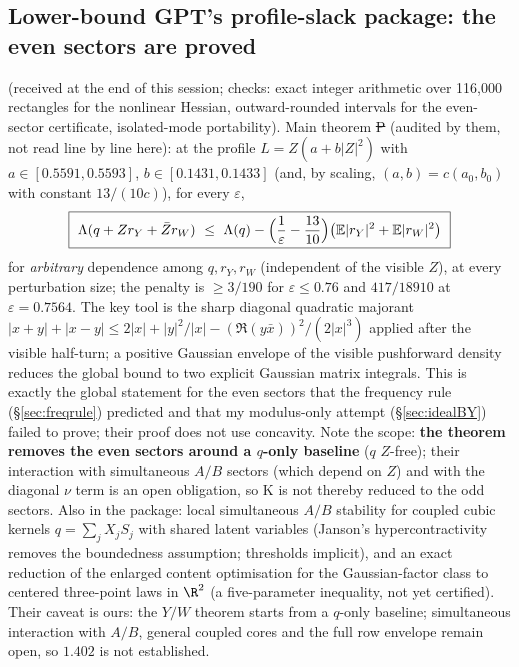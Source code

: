 \subsection{Lower-bound GPT's profile-slack package: the even sectors are proved}\label{sec:profileslack}
 (received at the end of this session; checks: exact integer arithmetic over 116,000 rectangles for the
nonlinear Hessian, outward-rounded intervals for the even-sector certificate, isolated-mode portability). Main theorem \st{P} (audited by them, not read line by line here): at the
profile $L=Z(a+b|Z|^2)$ with $a\in[0.5591,0.5593]$, $b\in[0.1431,0.1433]$ (and, by scaling, $(a,b)=c(a_0,b_0)$ with constant $13/(10c)$), for every $\varepsilon$,
\[
\boxed{\ \Lambda(q+Zr_Y+\bar Zr_W)\ \le\ \Lambda(q)-\Bigl(\frac1\varepsilon-\frac{13}{10}\Bigr)\bigl(\E|r_Y|^2+\E|r_W|^2\bigr)\ }
\]
for \emph{arbitrary} dependence among $q,r_Y,r_W$ (independent of the visible $Z$), at every perturbation size; the penalty is $\ge3/190$ for $\varepsilon\le0.76$ and $417/18910$ at $\varepsilon=0.7564$. The key tool is the sharp diagonal quadratic majorant $|x+y|+|x-y|\le2|x|+|y|^2/|x|-(\Re(y\bar x))^2/(2|x|^3)$ applied after the visible half-turn; a positive Gaussian envelope of the visible pushforward density reduces the global bound to two explicit Gaussian matrix integrals. This is exactly the global statement for the even sectors that the
frequency rule (\S\ref{sec:freqrule}) predicted and that my modulus-only attempt (\S\ref{sec:idealBY}) failed to prove; their proof does not use concavity. Note the scope: \textbf{the theorem removes the even sectors around a $q$-only baseline} ($q$ $Z$-free); their interaction with simultaneous $A/B$ sectors (which depend on $Z$) and with the diagonal $\nu$ term is an open obligation, so K is not thereby reduced to the odd sectors. Also in the package: local simultaneous $A/B$ stability for coupled cubic kernels
$q=\sum_jX_jS_j$ with shared latent variables (Janson's hypercontractivity removes the boundedness assumption; thresholds implicit), and an exact reduction of the enlarged content
optimisation for the Gaussian-factor class to centered three-point laws in $\R^2$ (a five-parameter inequality, not yet certified). Their caveat is ours: the $Y/W$ theorem starts from
a $q$-only baseline; simultaneous interaction with $A/B$, general coupled cores and the full row envelope remain open, so $1.402$ is not established.

